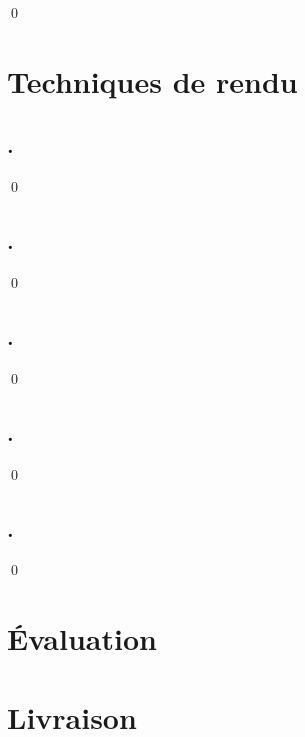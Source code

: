 \documentclass[12pt]{article}
\newcommand{\state}{\noindent}
\begin{document}
\state

\qed

\pagebreak

\section{Techniques de rendu}

\subsection{.}

\state

\qed

\subsection{.}

\state

\qed

\subsection{.}

\state

\qed

\subsection{.}

\state

\qed

\subsection{.}

\state

\qed

\pagebreak

\section*{Évaluation}

\pagebreak

\section*{Livraison}

\pagebreak
\end{document}

